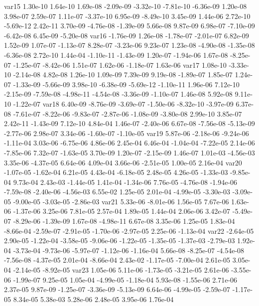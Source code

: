 var15  1.30e-10  1.64e-10  1.69e-08 -2.09e-09 -3.32e-10 -7.81e-10 -6.36e-09  1.20e-08  3.98e-07  2.59e-07  1.11e-07 -3.37e-10  6.95e-09 -8.49e-10  3.45e-09  1.44e-06  2.72e-10 -5.69e-12  2.42e-11  3.70e-09 -4.76e-08 -1.39e-09  5.66e-08  9.87e-09  6.98e-07 -7.10e-09 -6.42e-08  6.45e-09 -5.20e-08
var16 -1.76e-09  1.26e-08 -1.78e-07 -2.01e-07  6.82e-09  1.52e-09  1.07e-07 -1.13e-07  8.28e-07 -3.23e-06  9.23e-07  1.23e-08 -4.90e-08 -1.35e-08 -6.36e-08  2.72e-10  1.44e-04 -1.10e-11 -1.43e-09  1.20e-07 -1.94e-06  1.67e-08 -8.25e-07 -1.25e-07 -8.42e-06  1.51e-07  1.62e-06 -1.18e-07  1.63e-06
var17  1.08e-10 -3.33e-10 -2.14e-08  4.82e-08  1.26e-10  1.09e-09  7.39e-09  9.19e-08 -1.89e-07  1.85e-07  1.24e-07 -1.33e-09 -5.66e-09  3.98e-10 -6.38e-09 -5.69e-12 -1.10e-11  1.96e-06  7.12e-10 -2.15e-09 -7.59e-08 -4.98e-11 -4.54e-08 -3.36e-09 -1.10e-07  1.46e-08  5.92e-08  9.11e-10 -1.22e-07
var18  6.40e-09 -8.76e-09 -3.69e-07 -1.50e-06 -8.32e-10 -3.97e-09  6.37e-08 -7.61e-07 -8.22e-06 -9.83e-07 -2.87e-06 -1.08e-09 -3.80e-08  2.99e-10  3.85e-07  2.42e-11 -1.43e-09  7.12e-10  4.84e-04  1.46e-07 -2.40e-06  6.67e-08 -7.56e-08 -5.13e-09 -2.77e-06  2.98e-07  3.34e-06 -1.60e-07 -1.10e-05
var19  5.87e-06 -2.18e-06 -9.24e-06 -1.11e-04  3.03e-06 -6.75e-06  4.86e-06  2.45e-04  6.46e-04 -1.04e-04 -7.22e-05  2.14e-06 -7.85e-06  7.32e-07 -1.63e-05  3.70e-09  1.20e-07 -2.15e-09  1.46e-07  1.01e-03 -4.56e-03  3.35e-06 -4.37e-05  6.64e-06  4.09e-04  3.66e-06 -2.51e-05  1.00e-05  2.16e-04
var20 -1.07e-05 -1.62e-04  6.21e-05  4.43e-04 -6.18e-05  2.48e-05  4.26e-05 -1.33e-03 -9.85e-04  9.73e-04  2.43e-03 -1.44e-05  1.41e-04 -1.34e-06  7.76e-05 -4.76e-08 -1.94e-06 -7.59e-08 -2.40e-06 -4.56e-03  6.55e-02  1.25e-05  2.01e-04 -4.99e-05 -3.30e-03 -3.09e-05 -9.00e-05 -3.03e-05 -2.86e-03
var21  5.33e-06 -8.01e-06  1.56e-05  7.67e-06  1.63e-06 -1.37e-06  3.25e-06  7.81e-05  2.57e-04  1.89e-05  1.44e-04  2.06e-06  3.42e-07 -5.49e-07 -8.29e-06 -1.39e-09  1.67e-08 -4.98e-11  6.67e-08  3.35e-06  1.25e-05  1.83e-04 -8.66e-04 -2.59e-07 -2.91e-05 -1.70e-06 -2.97e-05  2.25e-06 -1.13e-04
var22 -2.64e-05  2.90e-05 -1.22e-04 -3.58e-05 -9.06e-06 -1.22e-05 -1.35e-05 -1.37e-03 -2.79e-03  1.92e-04 -3.73e-04 -9.73e-06 -5.97e-07 -1.12e-06 -1.16e-04  5.66e-08 -8.25e-07 -4.54e-08 -7.56e-08 -4.37e-05  2.01e-04 -8.66e-04  2.43e-02 -1.17e-05 -7.00e-04  2.61e-05  3.05e-04 -2.14e-05 -8.92e-05
var23  1.05e-06  5.11e-06 -1.73e-05 -3.21e-05  2.61e-06 -3.55e-06 -1.99e-07  9.25e-05  1.05e-04 -4.99e-05 -1.18e-04  5.93e-08 -1.55e-06  2.71e-06  2.37e-05  9.87e-09 -1.25e-07 -3.36e-09 -5.13e-09  6.64e-06 -4.99e-05 -2.59e-07 -1.17e-05  8.34e-05  5.38e-03  5.28e-06  2.48e-05  3.95e-06  1.76e-04
